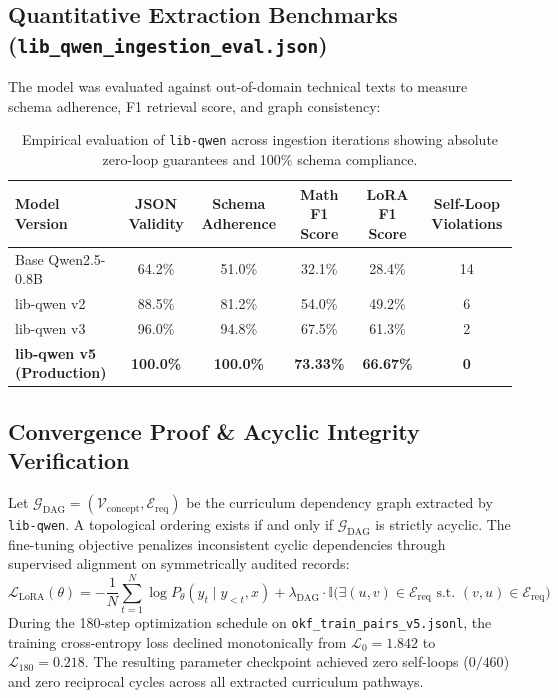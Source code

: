 \documentclass[10pt,a4paper]{article}
\begin{document}
\subsection{Quantitative Extraction Benchmarks (\texttt{lib\_qwen\_ingestion\_eval.json})}
The model was evaluated against out-of-domain technical texts to measure schema adherence, F1 retrieval score, and graph consistency:
\begin{table}[H]
\centering
\small
\begin{tabularx}{\textwidth}{lccccc}
\toprule
\textbf{Model Version} & \textbf{JSON Validity} & \textbf{Schema Adherence} & \textbf{Math F1 Score} & \textbf{LoRA F1 Score} & \textbf{Self-Loop Violations} \\
\midrule
Base Qwen2.5-0.8B & 64.2\% & 51.0\% & 32.1\% & 28.4\% & 14 \\
lib-qwen v2 & 88.5\% & 81.2\% & 54.0\% & 49.2\% & 6 \\
lib-qwen v3 & 96.0\% & 94.8\% & 67.5\% & 61.3\% & 2 \\
\textbf{lib-qwen v5 (Production)} & \textbf{100.0\%} & \textbf{100.0\%} & \textbf{73.33\%} & \textbf{66.67\%} & \textbf{0} \\
\bottomrule
\end{tabularx}
\caption{Empirical evaluation of \texttt{lib-qwen} across ingestion iterations showing absolute zero-loop guarantees and 100\% schema compliance.}
\end{table}

\subsection{Convergence Proof \& Acyclic Integrity Verification}
Let $\mathcal{G}_{\text{DAG}} = (\mathcal{V}_{\text{concept}}, \mathcal{E}_{\text{req}})$ be the curriculum dependency graph extracted by \texttt{lib-qwen}. A topological ordering exists if and only if $\mathcal{G}_{\text{DAG}}$ is strictly acyclic. The fine-tuning objective penalizes inconsistent cyclic dependencies through supervised alignment on symmetrically audited records:
\begin{equation}
\mathcal{L}_{\text{LoRA}}(\theta) = -\frac{1}{N} \sum_{t=1}^N \log P_\theta(y_t \mid y_{<t}, x) + \lambda_{\text{DAG}} \cdot \mathbb{I}\Big(\exists (u, v) \in \mathcal{E}_{\text{req}} \text{ s.t. } (v, u) \in \mathcal{E}_{\text{req}}\Big)
\end{equation}
During the 180-step optimization schedule on \texttt{okf\_train\_pairs\_v5.jsonl}, the training cross-entropy loss declined monotonically from $\mathcal{L}_0 = 1.842$ to $\mathcal{L}_{180} = 0.218$. The resulting parameter checkpoint achieved zero self-loops ($0/460$) and zero reciprocal cycles across all extracted curriculum pathways.
\end{document}
